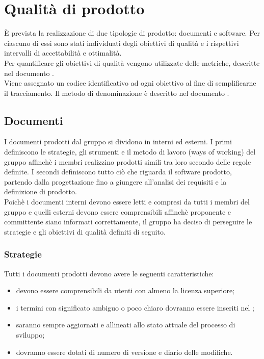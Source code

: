 \documentclass[PdQ.tex]{subfiles}
\begin{document}
\section{Qualità di prodotto}
	È prevista la realizzazione di due tipologie di prodotto: documenti e software. Per ciascuno di essi sono stati individuati
	degli obiettivi di qualità e i rispettivi intervalli di accettabilità e ottimalità. \\
	Per quantificare gli obiettivi di qualità vengono utilizzate delle metriche, descritte nel documento \NPdocRP{}. \\
	Viene assegnato un codice identificativo ad ogni obiettivo al fine di semplificarne il tracciamento. Il metodo di denominazione
	è descritto nel documento \NPdocRP{}.
	
	\subsection{Documenti}
		I documenti prodotti dal gruppo \GRUPPO{} si dividono in interni ed esterni. I primi definiscono le strategie, gli strumenti e il metodo di lavoro (ways of working)
		del gruppo affinchè i membri realizzino prodotti simili tra loro secondo delle regole definite. I secondi definiscono tutto ciò che riguarda il software prodotto,
		partendo dalla progettazione fino a giungere all'analisi dei requisiti e la definizione di prodotto. \\
		Poichè i documenti interni devono essere letti e compresi da tutti i membri del gruppo e quelli esterni devono essere comprensibili affinchè proponente e committente
		siano informati correttamente, il gruppo ha deciso di perseguire le strategie e gli obiettivi di qualità definiti di seguito.
	
		\subsubsection{Strategie}
		Tutti i documenti prodotti devono avere le seguenti caratteristiche:
		\begin{itemize}
			\item devono essere comprensibili da utenti con almeno la licenza superiore;
			\item i termini con significato ambiguo o poco chiaro dovranno essere inseriti nel \GldocRP{};
			\item saranno sempre aggiornati e allineati allo stato attuale del processo di sviluppo;
			\item dovranno essere dotati di numero di versione e diario delle modifiche.
		\end{itemize}
		
\end{document}
